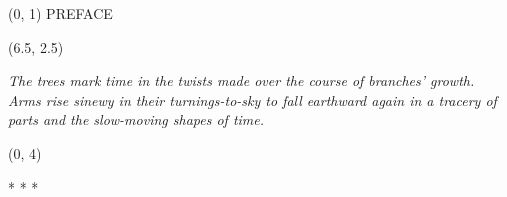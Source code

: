 \documentclass[10pt]{article}
\begin{document}
\begin{textblock}{23}(0, 1)
\center \huge PREFACE
\end{textblock}

\begin{textblock}{10}(6.5, 2.5)

\begin{center} \textit{The trees mark time in the twists made over the course
of branches' growth. Arms rise sinewy in their turnings-to-sky to fall
earthward again in a tracery of parts and the slow-moving shapes of time. }
 
\end{center}

\end{textblock}

\begin{textblock}{23}(0, 4)

\begin{center}
* * *
\end{center}

\end{textblock}
\end{document}
